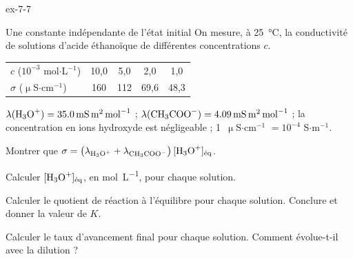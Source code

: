 \begin{blocLivre}{ex-7-7}
\begin{exercice}[2]{Une constante indépendante de l'état initial}
On mesure, à 25~°C, la conductivité de solutions d'acide éthanoïque de différentes concentrations $c$.
\begin{center}\small\renewcommand{\arraystretch}{1.2}
\begin{tabular}{@{}l*{4}{c}@{}}\toprule
$c$ ($10^{-3}$ mol$\cdot$L$^{-1}$) & 10,0 & 5,0 & 2,0 & 1,0\\
$\sigma$ ($\upmu$S$\cdot$cm$^{-1}$) & 160 & 112 & 69,6 & 48,3\\\bottomrule
\end{tabular}\end{center}
\begin{donnees}
$\lambda(\ce{H3O+})=\qty{35,0}{mS.m^2.mol^{-1}}$ ; $\lambda(\ce{CH3COO-})=\qty{4,09}{mS.m^2.mol^{-1}}$ ; la concentration
en ions hydroxyde est négligeable ; 1~$\upmu$S$\cdot$cm$^{-1}$ $=10^{-4}$ S$\cdot$m$^{-1}$.
\end{donnees}
\begin{questions}
\item Montrer que $\sigma=\left(\lambda_{\ce{H3O+}}+\lambda_{\ce{CH3COO-}}\right)[\ce{H3O+}]_\text{éq}$.
\item Calculer $[\ce{H3O+}]_\text{éq}$, en \unit{mol.L^{-1}}, pour chaque solution.
\item Calculer le quotient de réaction à l'équilibre pour chaque solution. Conclure et donner la valeur de $K$.
\item Calculer le taux d'avancement final pour chaque solution. Comment évolue-t-il avec la dilution ?
\end{questions}
\end{exercice}
\end{blocLivre}
